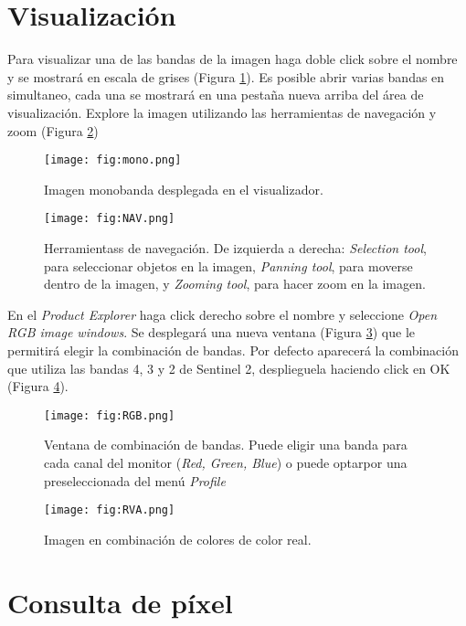 \section{Visualización}

Para visualizar una de las bandas de la imagen haga doble click sobre el nombre y se mostrará en escala de grises (Figura \ref{fig:mono}). Es posible abrir varias bandas en simultaneo, cada una se mostrará en una pestaña nueva arriba del área de visualización. Explore la imagen utilizando las herramientas de navegación y zoom (Figura \ref{fig:NAV})

\begin{figure}[h!]
    \centering
    \texttt{[image: fig:mono.png]}
    \caption{Imagen monobanda desplegada en el visualizador.}
    \label{fig:mono}
\end{figure}



\begin{figure}[h!]
    \centering
    \texttt{[image: fig:NAV.png]}
    \caption{Herramientass de navegación. De izquierda a derecha: \emph{Selection tool}, para seleccionar objetos en la imagen, \emph{Panning tool}, para moverse dentro de la imagen, y \emph{Zooming tool}, para hacer zoom en la imagen.}
    \label{fig:NAV}
\end{figure}

En el \emph{Product Explorer} haga click derecho sobre el nombre y seleccione \emph{Open RGB image windows}. Se desplegará una nueva ventana (Figura \ref{fig:RGB}) que le permitirá elegir la combinación de bandas. Por defecto aparecerá la combinación que utiliza las bandas 4, 3 y 2 de Sentinel 2, desplieguela haciendo click en OK (Figura \ref{fig:RVA}).

\begin{figure}[h!]
    \centering
    \texttt{[image: fig:RGB.png]}
    \caption{Ventana de combinación de bandas. Puede eligir una banda para cada canal del monitor (\emph{Red, Green, Blue}) o puede optarpor una preseleccionada del menú \emph{Profile}}
    \label{fig:RGB}
\end{figure}



\begin{figure}[h!]
    \centering
    \texttt{[image: fig:RVA.png]}
    \caption{Imagen en combinación de colores de color real.}
    \label{fig:RVA}
\end{figure}


\section{Consulta de píxel}

